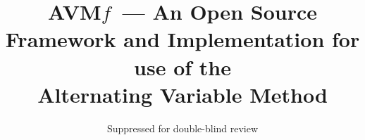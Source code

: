 \documentclass{llncs}
\newcommand{\name}{AVM\hspace{-1pt}$f$\xspace}
\begin{document}
\title{\name ~--- An Open Source Framework and Implementation for use of the \\ Alternating Variable Method}
\author{Suppressed for double-blind review}

\maketitle
\end{document}
